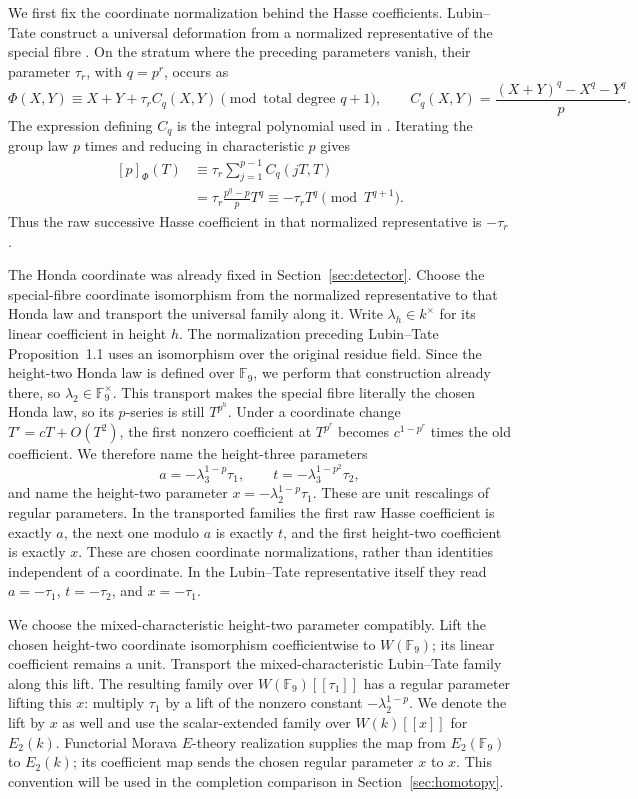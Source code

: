 We first fix the coordinate normalization behind the Hasse coefficients.
Lubin--Tate construct a universal deformation from a normalized
representative of the special fibre \citep[Proposition~1.1, p.~50,
and Theorem~3.1]{LT66}. On the stratum where the preceding parameters
vanish, their parameter \(\tau_r\), with \(q=p^r\), occurs as
\[
 \Phi(X,Y)\equiv X+Y+\tau_r C_q(X,Y)
       \pmod{\text{total degree }q+1},
 \qquad
 C_q(X,Y)=\frac{(X+Y)^q-X^q-Y^q}{p}.
\]
The expression defining \(C_q\) is the integral polynomial used in
\citet[equations~(2.4)--(2.5), p.~256]{Lazard55}. Iterating the group
law \(p\) times and reducing in characteristic \(p\) gives
\[
 \begin{split}
 [p]_{\Phi}(T)
 &\equiv \tau_r\sum_{j=1}^{p-1} C_q(jT,T)\\
 &=\tau_r\frac{p^q-p}{p}T^q
  \equiv-\tau_r T^q\pmod{T^{q+1}}.
 \end{split}
\]
Thus the raw successive Hasse coefficient in that normalized
representative is \(-\tau_r\).

The Honda coordinate was already fixed in Section~\ref{sec:detector}.
Choose the special-fibre coordinate isomorphism from the normalized
representative to that Honda law and transport the universal family
along it. Write \(\lambda_h\in k^\times\) for its linear coefficient
in height \(h\). The normalization preceding Lubin--Tate Proposition~1.1
uses an isomorphism over the original residue field. Since the height-two
Honda law is defined over \(\mathbb F_9\), we perform that construction
already there, so \(\lambda_2\in\mathbb F_9^\times\). This transport makes the special fibre literally the
chosen Honda law, so its \(p\)-series is still \(T^{p^h}\). Under a
coordinate change \(T'=cT+O(T^2)\), the first nonzero coefficient at
\(T^{p^r}\) becomes \(c^{1-p^r}\) times the old coefficient. We
therefore name the height-three parameters
\[
 a=-\lambda_3^{1-p}\tau_1,\qquad
 t=-\lambda_3^{1-p^2}\tau_2,
\]
and name the height-two parameter
\(x=-\lambda_2^{1-p}\tau_1\). These are unit rescalings of regular
parameters. In the transported families the first raw Hasse
coefficient is exactly \(a\), the next one modulo \(a\) is exactly
\(t\), and the first height-two coefficient is exactly \(x\). These
are chosen coordinate normalizations, rather than identities
independent of a coordinate. In the Lubin--Tate representative itself
they read \(a=-\tau_1\), \(t=-\tau_2\), and \(x=-\tau_1\).

We choose the mixed-characteristic height-two parameter compatibly.
Lift the chosen height-two coordinate isomorphism coefficientwise to
\(W(\mathbb F_9)\); its linear coefficient remains a unit. Transport the
mixed-characteristic Lubin--Tate family along this lift. The resulting
family over \(W(\mathbb F_9)[[\tau_1]]\) has a regular
parameter lifting this \(x\): multiply \(\tau_1\) by a lift of the
nonzero constant \(-\lambda_2^{1-p}\). We denote the lift by \(x\) as
well and use the scalar-extended family over \(W(k)[[x]]\) for \(E_2(k)\).
Functorial Morava \(E\)-theory realization
\citep[Section~7 and Corollary~7.7]{GH04} supplies the map from
\(E_2(\mathbb F_9)\) to \(E_2(k)\); its coefficient map sends the chosen
regular parameter \(x\) to \(x\). This convention will be
used in the completion comparison in Section~\ref{sec:homotopy}.

